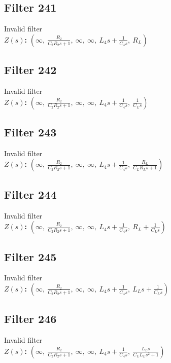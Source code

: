 \documentclass{article}
\begin{document}
\subsection*{Filter 241}
Invalid filter \\ 
\textbf{$Z(s)$:} $\left( \infty, \  \frac{R_{2}}{C_{2} R_{2} s + 1}, \  \infty, \  \infty, \  L_{4} s + \frac{1}{C_{4} s}, \  R_{L}\right)$ \\ 
\subsection*{Filter 242}
Invalid filter \\ 
\textbf{$Z(s)$:} $\left( \infty, \  \frac{R_{2}}{C_{2} R_{2} s + 1}, \  \infty, \  \infty, \  L_{4} s + \frac{1}{C_{4} s}, \  \frac{1}{C_{L} s}\right)$ \\ 
\subsection*{Filter 243}
Invalid filter \\ 
\textbf{$Z(s)$:} $\left( \infty, \  \frac{R_{2}}{C_{2} R_{2} s + 1}, \  \infty, \  \infty, \  L_{4} s + \frac{1}{C_{4} s}, \  \frac{R_{L}}{C_{L} R_{L} s + 1}\right)$ \\ 
\subsection*{Filter 244}
Invalid filter \\ 
\textbf{$Z(s)$:} $\left( \infty, \  \frac{R_{2}}{C_{2} R_{2} s + 1}, \  \infty, \  \infty, \  L_{4} s + \frac{1}{C_{4} s}, \  R_{L} + \frac{1}{C_{L} s}\right)$ \\ 
\subsection*{Filter 245}
Invalid filter \\ 
\textbf{$Z(s)$:} $\left( \infty, \  \frac{R_{2}}{C_{2} R_{2} s + 1}, \  \infty, \  \infty, \  L_{4} s + \frac{1}{C_{4} s}, \  L_{L} s + \frac{1}{C_{L} s}\right)$ \\ 
\subsection*{Filter 246}
Invalid filter \\ 
\textbf{$Z(s)$:} $\left( \infty, \  \frac{R_{2}}{C_{2} R_{2} s + 1}, \  \infty, \  \infty, \  L_{4} s + \frac{1}{C_{4} s}, \  \frac{L_{L} s}{C_{L} L_{L} s^{2} + 1}\right)$ \\ 
\end{document}
